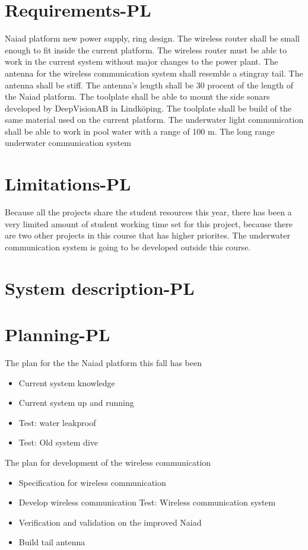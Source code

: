 \documentclass[a4paper, 10pt]{article} %
\begin{document}
\section{Requirements-PL}
Naiad platform new power supply, ring design.%
The wireless router shall be small enough to fit inside the current platform.
The wireless router must be able to work in the current system without major changes to the power plant.
The antenna for the wireless communication system shall resemble a stingray tail.
The antenna shall be stiff.
The antenna's length shall be 30 procent of the length of the Naiad platform.
The toolplate shall be able to mount the side sonars developed by DeepVisionAB in Lindköping.
The toolplate shall be build of the same material used on the current platform.
The underwater light communication shall be able to work in pool water with a range of 100 m.
The long range underwater communication system 



\section{Limitations-PL}
Because all the projects share the student resources this year, there has been a very limited amount of student working time set for this project, because there are two other projects in this course that has higher priorites.
The underwater communication system is going to be developed outside this course.



\section{System description-PL}

\section{Planning-PL}
The plan for the the Naiad platform this fall has been
\begin{itemize}
\item Current system knowledge
\item Current system up and running
\item Test: water leakproof
\item Test: Old system dive
\end{itemize}

The plan for development of the wireless communication
\begin{itemize}
\item Specification for wireless communication
\item Develop wireless communication
\Item Test: Wireless communication system
\item Verification and validation on the improved Naiad
\item  Build tail antenna
\end{itemize}
\end{document}
